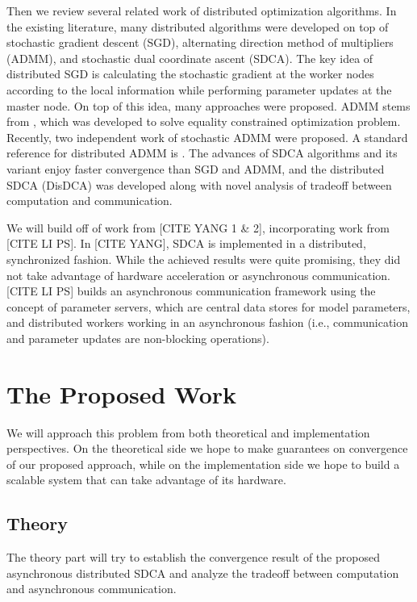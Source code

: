 \documentclass{article}
\begin{document}
Then we review several related work of distributed optimization algorithms. In the existing literature, many distributed algorithms were developed on top of stochastic gradient descent (SGD), alternating direction method of multipliers (ADMM), and stochastic dual coordinate ascent (SDCA). The key idea of distributed SGD is calculating the stochastic gradient at the worker nodes according to the local information while performing parameter updates at the master node. On top of this idea, many approaches were proposed\cite{zinkevich2010parallelized,recht2011hogwild,agarwal2011distributed}. ADMM stems from \cite{gabay1976dual}, which was developed to solve equality constrained optimization problem. Recently, two independent work of stochastic ADMM were proposed\cite{ouyang2013stochastic,suzuki2013dual}. A standard reference for distributed ADMM is \cite{boyd2011distributed}. The advances of SDCA algorithms\cite{shalev2013stochastic} and its variant\cite{shalev2013accelerated,shalev2014accelerated,lin2014accelerated} enjoy faster convergence than SGD and ADMM, and the distributed SDCA (DisDCA)\cite{yang2013trading,yang2013analysis} was developed along with novel analysis of tradeoff between computation and communication.

We will build off of work from [CITE YANG 1 \& 2], incorporating work from [CITE
LI PS]. In [CITE YANG], SDCA is implemented in a distributed, synchronized
fashion. While the achieved results were quite promising, they did not take
advantage of hardware acceleration or asynchronous communication. [CITE LI PS]
builds an asynchronous communication framework using the concept of parameter
servers, which are central data stores for model parameters, and distributed
workers working in an asynchronous fashion (i.e., communication and parameter
updates are non-blocking operations).

\section{The Proposed Work}
We will approach this problem from both theoretical and implementation
perspectives. On the theoretical side we hope to make guarantees on convergence
of our proposed approach, while on the implementation side we hope to build a
scalable system that can take advantage of its hardware.

\subsection{Theory}
The theory part will try to establish the convergence result of the proposed asynchronous distributed SDCA and analyze the tradeoff between computation and asynchronous communication.
\end{document}
